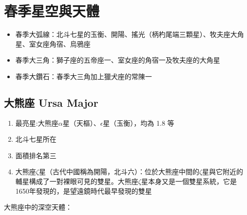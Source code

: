 \section{春季星空與天體}
\begin{itemize}
    \item 春季大弧線：北斗七星的玉衡、開陽、搖光（柄杓尾端三顆星）、牧夫座大角星、室女座角宿、烏鴉座
    \item 春季大三角：獅子座的五帝座一、室女座的角宿一及牧夫座的大角星
    \item 春季大鑽石：春季大三角加上獵犬座的常陳一
\end{itemize}

\subsection{大熊座 Ursa Major}
\begin{enumerate}
    \item 最亮星:大熊座\(\alpha\)星（天樞）、\(\epsilon\)星（玉衡），均為 1.8 等
    \item 北斗七星所在
    \item 面積排名第三
    \item 大熊座\(\zeta\)星（古代中國稱為開陽，北斗六）：位於大熊座中間的\(\zeta\)星與它附近的輔星構成了一對裸眼可見的雙星。大熊座\(\zeta\)星本身又是一個雙星系統，它是1650年發現的，是望遠鏡時代最早發現的雙星
\end{enumerate}
大熊座中的深空天體：

